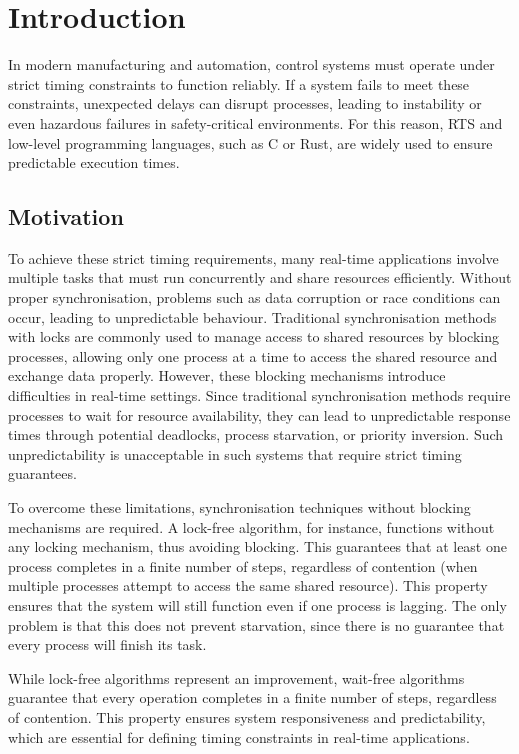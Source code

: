 \chapter{Introduction}\label{ch:introduction}
In modern manufacturing and automation, control systems must operate under strict timing constraints to function reliably. If a system fails to meet these constraints, unexpected delays can disrupt processes, leading to instability or even hazardous failures in safety-critical environments. For this reason, \ac{RTS} and low-level programming languages, such as C or Rust, are widely used to ensure predictable execution times.
\section{Motivation}\label{sec:motivation}
To achieve these strict timing requirements, many real-time applications involve multiple tasks that must run concurrently and share resources efficiently. Without proper synchronisation, problems such as data corruption or race conditions can occur, leading to unpredictable behaviour. Traditional synchronisation methods with locks are commonly used to manage access to shared resources by blocking processes, allowing only one process at a time to access the shared resource and exchange data properly. However, these blocking mechanisms introduce difficulties in real-time settings. Since traditional synchronisation methods require processes to wait for resource availability, they can lead to unpredictable response times through potential deadlocks, process starvation, or priority inversion. Such unpredictability is unacceptable in such systems that require strict timing guarantees. \cite{herlihy1991wait, brandenburg2019multiprocessorrealtimelockingprotocols, kode2024analysisSynchronization}

To overcome these limitations, synchronisation techniques without blocking mechanisms are required. A lock-free algorithm, for instance, functions without any locking mechanism, thus avoiding blocking. This guarantees that at least one process completes in a finite number of steps, regardless of contention (when multiple processes attempt to access the same shared resource). This property ensures that the system will still function even if one process is lagging. The only problem is that this does not prevent starvation, since there is no guarantee that every process will finish its task. \cite{kogan2012methodology}

While lock-free algorithms represent an improvement, wait-free algorithms guarantee that every operation completes in a finite number of steps, regardless of contention. This property ensures system responsiveness and predictability, which are essential for defining timing constraints in real-time applications. \cite{kogan2012methodology, herlihy1991wait, brandenburg2019multiprocessorrealtimelockingprotocols}

